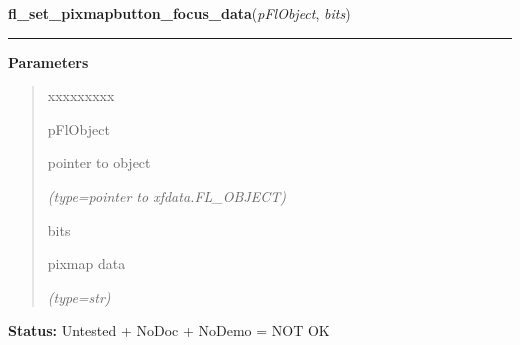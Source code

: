 \hspace{.8\funcindent}\begin{boxedminipage}{\funcwidth}

    \raggedright \textbf{fl\_set\_pixmapbutton\_focus\_data}(\textit{pFlObject}, \textit{bits})

    \vspace{-1.5ex}

    \rule{\textwidth}{0.5\fboxrule}
\setlength{\parskip}{2ex}
\setlength{\parskip}{1ex}
      \textbf{Parameters}
      \vspace{-1ex}

      \begin{quote}
        \begin{Ventry}{xxxxxxxxx}

          \item[pFlObject]

          pointer to object

            {\it (type=pointer to xfdata.FL\_OBJECT)}

          \item[bits]

          pixmap data

            {\it (type=str)}

        \end{Ventry}

      \end{quote}

\textbf{Status:} Untested + NoDoc + NoDemo = NOT OK



    \end{boxedminipage}

    \label{xformslib:flbutton:fl_set_pixmapbutton_focus_file}

    \vspace{0.5ex}

